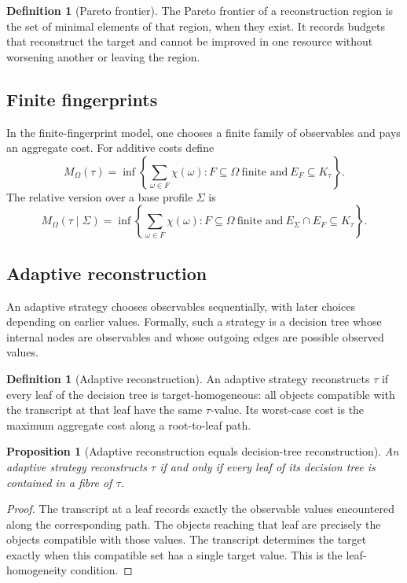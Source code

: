 \documentclass[11pt]{article}
\newtheorem{proposition}[theorem]{Proposition}
\theoremstyle{definition}
\newtheorem{definition}[theorem]{Definition}
\theoremstyle{remark}
\begin{document}
\begin{definition}[Pareto frontier]
The Pareto frontier of a reconstruction region is the set of minimal elements of that region, when they exist.  It records budgets that reconstruct the target and cannot be improved in one resource without worsening another or leaving the region.
\end{definition}

\subsection{Finite fingerprints}

In the finite-fingerprint model, one chooses a finite family of observables and pays an aggregate cost.  For additive costs define
\[
M_\Omega(\tau)
=
\inf\left\{\sum_{\omega\in F}\chi(\omega):
F\subseteq\Omega\ \text{finite and}\ E_F\subseteq K_\tau\right\}.
\]
The relative version over a base profile \(\Sigma\) is
\[
M_\Omega(\tau\mid\Sigma)
=
\inf\left\{\sum_{\omega\in F}\chi(\omega):
F\subseteq\Omega\ \text{finite and}\ E_\Sigma\cap E_F\subseteq K_\tau\right\}.
\]

\subsection{Adaptive reconstruction}

An adaptive strategy chooses observables sequentially, with later choices depending on earlier values.  Formally, such a strategy is a decision tree whose internal nodes are observables and whose outgoing edges are possible observed values.

\begin{definition}[Adaptive reconstruction]
An adaptive strategy reconstructs \(\tau\) if every leaf of the decision tree is target-homogeneous: all objects compatible with the transcript at that leaf have the same \(\tau\)-value.  Its worst-case cost is the maximum aggregate cost along a root-to-leaf path.
\end{definition}

\begin{proposition}[Adaptive reconstruction equals decision-tree reconstruction]
An adaptive strategy reconstructs \(\tau\) if and only if every leaf of its decision tree is contained in a fibre of \(\tau\).
\end{proposition}

\begin{proof}
The transcript at a leaf records exactly the observable values encountered along the corresponding path.  The objects reaching that leaf are precisely the objects compatible with those values.  The transcript determines the target exactly when this compatible set has a single target value.  This is the leaf-homogeneity condition.
\end{proof}
\end{document}

